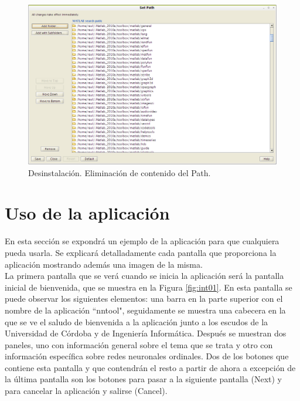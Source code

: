 			\begin{figure}[htbp]
				\centering
				\includegraphics[scale=0.4]{img/path.png}
				\caption{Desinstalación. Eliminación de contenido del Path.}
				\label{fig:path2}
			\end{figure}
		
	\section{Uso de la aplicación}
	
		En esta sección se expondrá un ejemplo de la aplicación para que cualquiera pueda usarla. Se explicará detalladamente cada pantalla que proporciona la aplicación mostrando además una imagen de la misma.\\
		
		La primera pantalla que se verá cuando se inicia la aplicación será la pantalla inicial de bienvenida, que se muestra en la Figura \ref{fig:int01}. En esta pantalla se puede observar los siguientes elementos: una barra en la parte superior con el nombre de la aplicación ``nntool", seguidamente se muestra una cabecera en la que se ve el saludo de bienvenida a la aplicación junto a los escudos de la Universidad de Córdoba y de Ingeniería Informática. Después se muestran dos paneles, uno con información general sobre el tema que se trata y otro con información específica sobre redes neuronales ordinales. Dos de los botones que contiene esta pantalla y que contendrán el resto a partir de ahora a excepción de la última pantalla son los botones para pasar a la siguiente pantalla (Next) y para cancelar la aplicación y salirse (Cancel).\\
		
